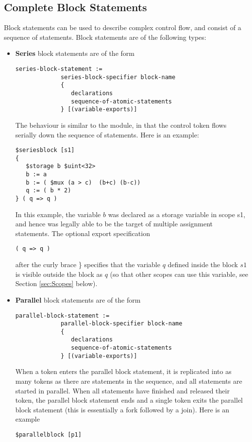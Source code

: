 \documentclass{article}
\begin{document}
\subsection{Complete Block Statements}

Block statements can be used to describe complex
control flow,  and consist of a sequence of statements.
Block statements are of
the following types:
\begin{itemize}
\item {\bf Series} block statements are of the form
\begin{verbatim}
series-block-statement :=
             series-block-specifier block-name
             { 
                declarations
                sequence-of-atomic-statements
             } [(variable-exports)]
\end{verbatim}
The behaviour is similar to the module, in that the control
token flows serially down the sequence of statements.
Here is an example:
\begin{verbatim}
$seriesblock [s1] 
{
   $storage b $uint<32>
   b := a
   b := ( $mux (a > c)  (b+c) (b-c))
   q := ( b * 2)
} ( q => q )
\end{verbatim}
In this example, the variable $b$ was declared as
a storage variable in scope s1, and hence was legally
able to be the target of multiple assignment statements.
The optional export specification
\begin{verbatim}
( q => q )
\end{verbatim}
after the curly brace \} specifies that the variable
$q$ defined inside the block $s1$ is visible outside
the block as $q$ (so that other scopes can use this
variable, see Section \ref{sec:Scopes} below).
\item {\bf Parallel} block statements are of the form
\begin{verbatim}
parallel-block-statement :=
             parallel-block-specifier block-name
             { 
                declarations
                sequence-of-atomic-statements
             } [(variable-exports)]
\end{verbatim}
When a token enters the parallel block statement, it
is replicated into as many tokens as there are statements in
the sequence, and all statements are started in parallel.
When all statements have finished and released their token,
the parallel block statement
ends and a single token exits the parallel block statement (this
is essentially a fork followed by a join).
Here is an example
\begin{verbatim}
$parallelblock [p1] 

\end{verbatim}
\end{itemize}
\end{document}
